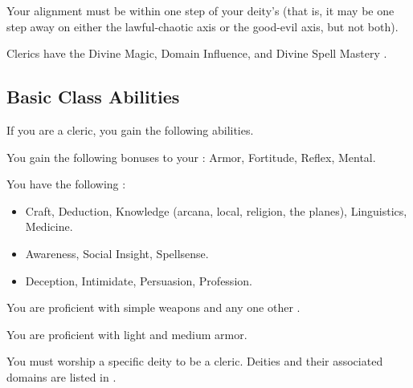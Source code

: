      Your alignment must be within one step of your deity's (that is, it may be one step away on either the lawful-chaotic axis or the good-evil axis, but not both).

     Clerics have the Divine Magic, Domain Influence, and Divine Spell Mastery .

    \subsection{Basic Class Abilities}
        If you are a cleric, you gain the following abilities.

        You gain the following bonuses to your :  Armor,  Fortitude,  Reflex,  Mental.

        You have the following :
        \begin{itemize}
            \item {} Craft, Deduction, Knowledge (arcana, local, religion, the planes), Linguistics, Medicine.
            \item {} Awareness, Social Insight, Spellsense.
            \item {} Deception, Intimidate, Persuasion, Profession.
        \end{itemize}

        You are proficient with simple weapons and any one other .

        You are proficient with light and medium armor.

        You must worship a specific deity to be a cleric.
        Deities and their associated domains are listed in .

